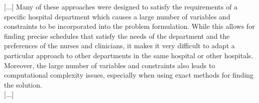 [...] Many of these approaches were designed to satisfy the requirements of a specific hospital department which causes a large number of variables and constraints to be incorporated into the problem formulation. While this allows for finding precise schedules that satisfy the needs of the department and the preferences of the nurses and clinicians, it makes it very difficult to adapt a particular approach to other departments in the same hospital or other hospitals. Moreover, the large number of variables and constraints also leads to computational complexity issues, especially when using exact methods for finding the solution. \\

[...]


